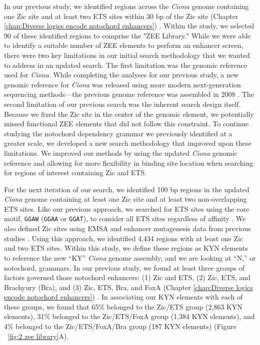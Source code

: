 In our previous study, we identified regions across the \textit{Ciona} genome containing one Zic site and at least two ETS sites within 30 bp of the Zic site (Chapter \ref{chap:Diverse logics encode notochord enhancers}) \cite{song2022,farley2016}. Within the study, we selected 90 of these identified regions to comprise the "ZEE Library." While we were able to identify a suitable number of ZEE elements to perform an enhancer screen, there were two key limitations in our initial search methodology that we wanted to address in an updated search. The first limitation was the genomic reference used for \textit{Ciona}. While completing the analyses for our previous study, a new genomic reference for \textit{Ciona} was released using more modern next-generation sequencing methods—the previous genome reference was assembled in 2008 \cite{satou2019,dehal2002}. The second limitation of our previous search was the inherent search design itself. Because we fixed the Zic site in the center of the genomic element, we potentially missed functional ZEE elements that did not follow this constraint. To continue studying the notochord dependency grammar we previously identified at a greater scale, we developed a new search methodology that improved upon these limitations. We improved our methods by using the updated \textit{Ciona} genomic reference and allowing for more flexibility in binding site location when searching for regions of interest containing Zic and ETS. 

For the next iteration of our search, we identified 100 bp regions in the updated \textit{Ciona} genome containing at least one Zic site and at least two non-overlapping ETS sites. Like our previous approach, we searched for ETS sites using the core motif, \verb|GGAW| (\verb|GGAA| or \verb|GGAT|), to consider all ETS sites regardless of affinity \cite{lamber2008,wei2010,song2022}. We also defined Zic sites using EMSA and enhancer mutagenesis data from previous studies \cite{matsumoto2007a,takahashi1999,yagi2004,song2022}. Using this approach, we identified 4,434 regions with at least one Zic and two ETS sites. Within this study, we define these regions as KYN elements to reference the new “KY” \textit{Ciona} genome assembly, and we are looking at “N,” or notochord, grammars. In our previous study, we found at least three groups of factors governed those notochord enhancers: (1) Zic and ETS, (2) Zic, ETS, and Brachyury (Bra), and (3) Zic, ETS, Bra, and FoxA (Chapter \ref{chap:Diverse logics encode notochord enhancers}) \cite{song2022}. In associating our KYN elements with each of these groups, we found that 65\% belonged to the Zic/ETS group (2,863 KYN elements), 31\% belonged to the Zic/ETS/FoxA group (1,384 KYN elements), and 4\% belonged to the Zic/ETS/FoxA/Bra group (187 KYN elements) (Figure ~\ref{fig:2 zee library}A). 

